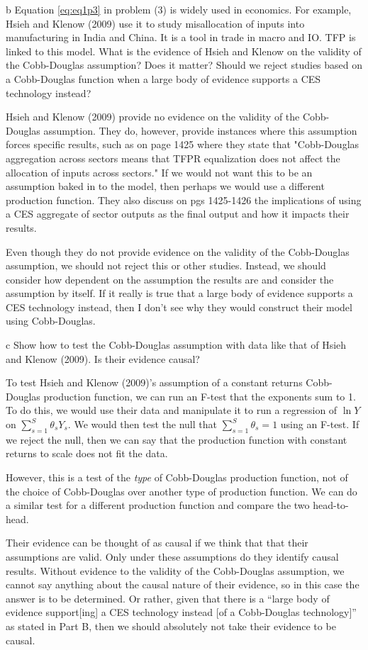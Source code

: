 \documentclass{article}
\begin{document}
\begin{problem}{b}
Equation \eqref{eq:eq1p3} in problem (3) is widely used in economics. For example, Hsieh and Klenow (2009) use it to study misallocation of inputs into manufacturing in India and China. It is a tool in trade in macro and IO. TFP is linked to this model. What is the evidence of Hsieh and Klenow on the validity of the Cobb-Douglas assumption? Does it matter? Should we reject studies based on a Cobb-Douglas function when a large body of evidence supports a CES technology instead?
\end{problem}
Hsieh and Klenow (2009) provide no evidence on the validity of the Cobb-Douglas assumption. They do, however, provide instances where this assumption forces specific results, such as on page 1425 where they state that "Cobb-Douglas aggregation across sectors means that TFPR equalization does not affect the allocation of inputs across sectors." If we would not want this to be an assumption baked in to the model, then perhaps we would use a different production function. They also discuss on pgs 1425-1426 the implications of using a CES aggregate of sector outputs as the final output and how it impacts their results.

Even though they do not provide evidence on the validity of the Cobb-Douglas assumption, we should not reject this or other studies. Instead, we should consider how dependent on the assumption the results are and consider the assumption by itself. If it really is true that a large body of evidence supports a CES technology instead, then I don't see why they would construct their model using Cobb-Douglas.

\begin{problem}{c}
Show how to test the Cobb-Douglas assumption with data like that of Hsieh and Klenow (2009). Is their evidence causal?
\end{problem}

To test Hsieh and Klenow (2009)'s assumption of a constant returns Cobb-Douglas production function, we can run an F-test that the exponents sum to 1. To do this, we would use their data and manipulate it to run a regression of $\ln Y$ on $ \sum_{s=1}^S \theta_s Y_s$. We would then test the null that $\sum_{s=1}^S \theta_s = 1$ using an F-test. If we reject the null, then we can say that the production function with constant returns to scale does not fit the data. 

However, this is a test of the \textit{type} of Cobb-Douglas production function, not of the choice of Cobb-Douglas over another type of production function. We can do a similar test for a different production function and compare the two head-to-head.

Their evidence can be thought of as causal if we think that that their assumptions are valid. Only under these assumptions do they identify causal results. Without evidence to the validity of the Cobb-Douglas assumption, we cannot say anything about the causal nature of their evidence, so in this case the answer is to be determined. Or rather, given that there is a ``large body of evidence support[ing] a CES technology instead [of a Cobb-Douglas technology]'' as stated in Part B, then we should absolutely not take their evidence to be causal.
\end{document}
